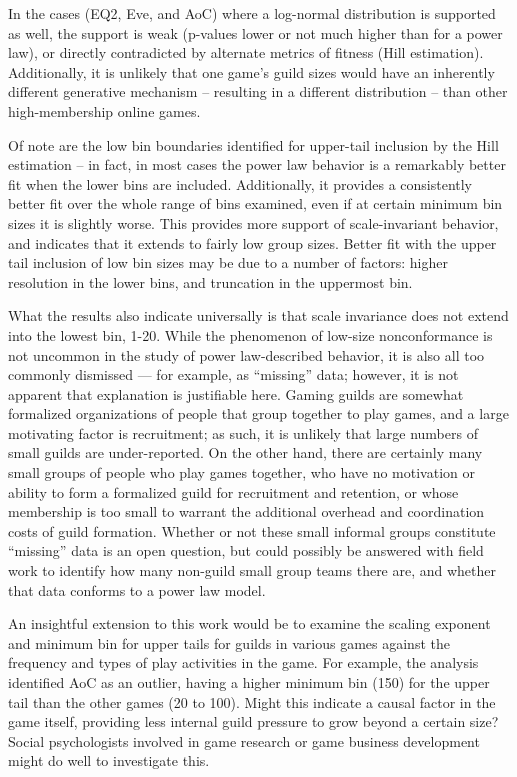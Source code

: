 \documentclass[pdftex,12pt]{llncs}
\begin{document}
In the cases (EQ2, Eve, and AoC) where a log-normal distribution is supported as well, the support is weak (p-values lower or not much higher than for a power law), or directly contradicted by alternate metrics of fitness (Hill estimation).
Additionally, it is unlikely that one game’s guild sizes would have an inherently different generative mechanism – resulting in a different distribution – than other high-membership online games.  

Of note are the low bin boundaries identified for upper-tail inclusion by the Hill estimation – in fact, in most cases the power law behavior is a remarkably better fit when the lower bins are included.
Additionally, it provides a consistently better fit over the whole range of bins examined, even if at certain minimum bin sizes it is slightly worse.
This provides more support of scale-invariant behavior, and indicates that it extends to fairly low group sizes.
Better fit with the upper tail inclusion of low bin sizes may be due to a number of factors:  higher resolution in the lower bins, and truncation in the uppermost bin. 

What the results also indicate universally is that scale invariance does not extend into the lowest bin, 1-20.
While the phenomenon of low-size nonconformance is not uncommon in the study of power law-described behavior, it is also all too commonly dismissed --- for example, as “missing” data; however, it is not apparent that explanation is justifiable here.
Gaming guilds are somewhat formalized organizations of people that group together to play games, and a large motivating factor is recruitment; as such, it is unlikely that large numbers of small guilds are under-reported.
On the other hand, there are certainly many small groups of people who play games together, who have no motivation or ability to form a formalized guild for recruitment and retention, or whose membership is too small to warrant the additional overhead and coordination costs of guild formation.
Whether or not these small informal groups constitute “missing” data is an open question, but could possibly be answered with field work to identify how many non-guild small group teams there are, and whether that data conforms to a power law model.

An insightful extension to this work would be to examine the scaling exponent and minimum bin for upper tails for guilds in various games against the frequency and types of play activities in the game.
For example, the analysis identified AoC as an outlier, having a higher minimum bin (150) for the upper tail than the other games (20 to 100).
Might this indicate a causal factor in the game itself, providing less internal guild pressure to grow beyond a certain size?
Social psychologists involved in game research or game business development might do well to investigate this.
\end{document}
